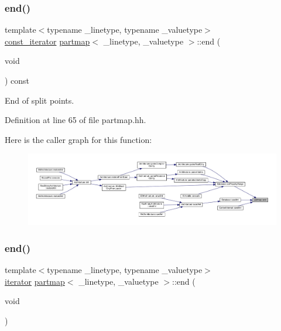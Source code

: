 \subsubsection{\texorpdfstring{end()}{end()}\hspace{0.1cm}{\footnotesize\ttfamily [1/2]}}
{\footnotesize\ttfamily template$<$typename \+\_\+linetype, typename \+\_\+valuetype$>$ \\
\mbox{\hyperlink{classpartmap_a01c7ea382b2a493dbd4a4431a2c39520}{const\+\_\+iterator}} \mbox{\hyperlink{classpartmap}{partmap}}$<$ \+\_\+linetype, \+\_\+valuetype $>$\+::end (\begin{DoxyParamCaption}\item[{void}]{ }\end{DoxyParamCaption}) const\hspace{0.3cm}{\ttfamily [inline]}}



End of split points. 



Definition at line 65 of file partmap.\+hh.

Here is the caller graph for this function\+:
\nopagebreak
\begin{figure}[H]
\begin{center}
\leavevmode
\includegraphics[width=350pt]{classpartmap_a2bff6a7424e587f2e29ea8a7fcf81a43_icgraph}
\end{center}
\end{figure}
\mbox{\label{classpartmap_a38026e8e8c8878781ac17d69124b0bd4}} 
\subsubsection{\texorpdfstring{end()}{end()}\hspace{0.1cm}{\footnotesize\ttfamily [2/2]}}
{\footnotesize\ttfamily template$<$typename \+\_\+linetype, typename \+\_\+valuetype$>$ \\
\mbox{\hyperlink{classpartmap_a795a7501233dbf866b98a51585552d06}{iterator}} \mbox{\hyperlink{classpartmap}{partmap}}$<$ \+\_\+linetype, \+\_\+valuetype $>$\+::end (\begin{DoxyParamCaption}\item[{void}]{ }\end{DoxyParamCaption})\hspace{0.3cm}{\ttfamily [inline]}}



